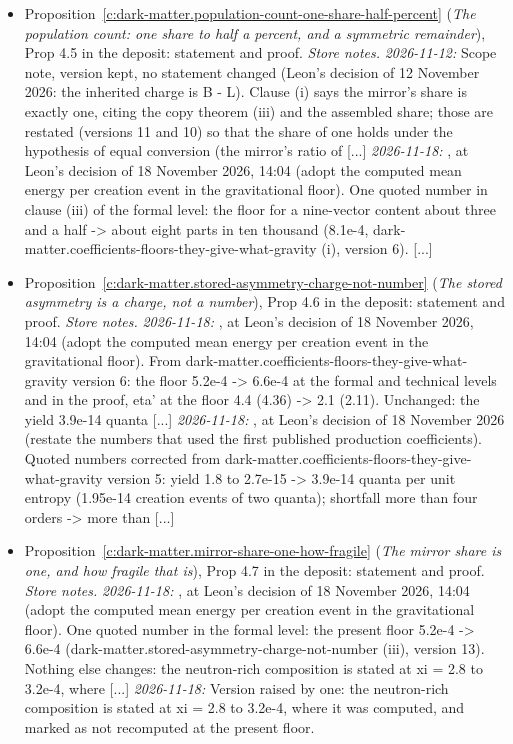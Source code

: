 \documentclass[11pt]{article}
\theoremstyle{definition}
\theoremstyle{plain}
\begin{document}
\begin{itemize}
\item Proposition~\ref{c:dark-matter.population-count-one-share-half-percent} (\emph{The population count: one share to half a percent, and a symmetric remainder}), Prop 4.5 in the deposit: statement and proof. \emph{Store notes.} \emph{2026-11-12:} Scope note, version kept, no statement changed (Leon's decision of 12 November 2026: the inherited charge is B - L). Clause (i) says the mirror's share is exactly one, citing the copy theorem (iii) and the assembled share; those are restated (versions 11 and 10) so that the share of one holds under the hypothesis of equal conversion (the mirror's ratio of [...] \emph{2026-11-18:} , at Leon's decision of 18 November 2026, 14:04 (adopt the computed mean energy per creation event in the gravitational floor). One quoted number in clause (iii) of the formal level: the floor for a nine-vector content about three and a half -> about eight parts in ten thousand (8.1e-4, dark-matter.coefficients-floors-they-give-what-gravity (i), version 6). [...]
\item Proposition~\ref{c:dark-matter.stored-asymmetry-charge-not-number} (\emph{The stored asymmetry is a charge, not a number}), Prop 4.6 in the deposit: statement and proof. \emph{Store notes.} \emph{2026-11-18:} , at Leon's decision of 18 November 2026, 14:04 (adopt the computed mean energy per creation event in the gravitational floor). From dark-matter.coefficients-floors-they-give-what-gravity version 6: the floor 5.2e-4 -> 6.6e-4 at the formal and technical levels and in the proof, eta' at the floor 4.4 (4.36) -> 2.1 (2.11). Unchanged: the yield 3.9e-14 quanta [...] \emph{2026-11-18:} , at Leon's decision of 18 November 2026 (restate the numbers that used the first published production coefficients). Quoted numbers corrected from dark-matter.coefficients-floors-they-give-what-gravity version 5: yield 1.8 to 2.7e-15 -> 3.9e-14 quanta per unit entropy (1.95e-14 creation events of two quanta); shortfall more than four orders -> more than [...]
\item Proposition~\ref{c:dark-matter.mirror-share-one-how-fragile} (\emph{The mirror share is one, and how fragile that is}), Prop 4.7 in the deposit: statement and proof. \emph{Store notes.} \emph{2026-11-18:} , at Leon's decision of 18 November 2026, 14:04 (adopt the computed mean energy per creation event in the gravitational floor). One quoted number in the formal level: the present floor 5.2e-4 -> 6.6e-4 (dark-matter.stored-asymmetry-charge-not-number (iii), version 13). Nothing else changes: the neutron-rich composition is stated at xi = 2.8 to 3.2e-4, where [...] \emph{2026-11-18:} Version raised by one: the neutron-rich composition is stated at xi = 2.8 to 3.2e-4, where it was computed, and marked as not recomputed at the present floor.

\end{itemize}
\end{document}
